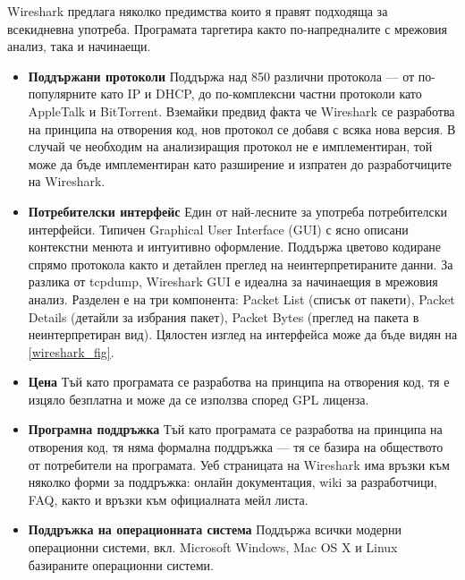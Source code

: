 \documentclass[12pt,a4paper,oneside]{book}
\begin{document}
Wireshark предлага няколко предимства които я правят подходяща за всекидневна
употреба. Програмата таргетира както по-напредналите с мрежовия анализ, така и
начинаещи.

\begin{itemize}
  \item \textbf{Поддържани протоколи} Поддържа над 850 различни протокола --- от
    по-популярните като IP и DHCP, до по-комплексни частни протоколи като
    AppleTalk и BitTorrent. Вземайки предвид факта че Wireshark се разработва на
    принципа на отворения код, нов протокол се добавя с всяка нова версия. В
    случай че необходим на анализиращия протокол не е имплементиран, той може да
    бъде имплементиран като разширение и изпратен до разработчиците на
    Wireshark.
  \item \textbf{Потребителски интерфейс} Един от най-лесните за употреба
    потребителски интерфейси. Типичен Graphical User Interface (GUI) с ясно
    описани контекстни менюта и интуитивно оформление. Поддържа цветово кодиране
    спрямо протокола както и детайлен преглед на неинтерпретираните данни. За
    разлика от tcpdump, Wireshark GUI е идеална за начинаещия в мрежовия анализ.
    Разделен е на три компонента: Packet List (списък от пакети),
    Packet Details (детайли за избрания пакет), Packet Bytes (преглед на пакета
    в неинтерпретиран вид). Цялостен изглед на интерфейса може да бъде видян на
    \autoref{wireshark_fig}.
  \item \textbf{Цена} Тъй като програмата се разработва на принципа на отворения
    код, тя е изцяло безплатна и може да се използва според GPL лиценза.
  \item \textbf{Програмна поддръжка} Тъй като програмата се разработва на
    принципа на отворения код, тя няма формална поддръжка --- тя се
    базира на обществото от потребители на програмата. Уеб страницата на
    Wireshark има връзки към няколко форми за поддръжка: онлайн документация,
    wiki за разработчици, FAQ, както и връзки към официалната мейл листа.
  \item \textbf{Поддръжка на операционната система} Поддържа всички модерни
    операционни системи, вкл. Microsoft Windows, Mac OS X и Linux базираните
    операционни системи.
\end{itemize}
\end{document}
